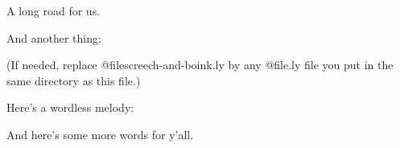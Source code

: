 \documentclass[a5paper,twoside,9pt]{extbook}
\begin{document}
A long road for us.

\begin{quote}
{%
\parindent 0pt
\noindent
\ifx\preLilyPondExample \undefined
\else
  \expandafter\preLilyPondExample
\fi
\def\lilypondbook{}%

\ifx\postLilyPondExample \undefined
\else
  \expandafter\postLilyPondExample
\fi
}
\end{quote}

And another thing:

\begin{quote}
{%
\parindent 0pt
\noindent
\ifx\preLilyPondExample \undefined
\else
  \expandafter\preLilyPondExample
\fi
\def\lilypondbook{}%

\ifx\postLilyPondExample \undefined
\else
  \expandafter\postLilyPondExample
\fi
}
\end{quote}

(If needed, replace @file{screech-and-boink.ly} by any @file{.ly} file
you put in the same directory as this file.)

Here's a wordless melody:
\begin{quote}
{%
\parindent 0pt
\noindent
\ifx\preLilyPondExample \undefined
\else
  \expandafter\preLilyPondExample
\fi
\def\lilypondbook{}%

\ifx\postLilyPondExample \undefined
\else
  \expandafter\postLilyPondExample
\fi
}
\end{quote}

And here's some more words for y'all.
\end{document}
